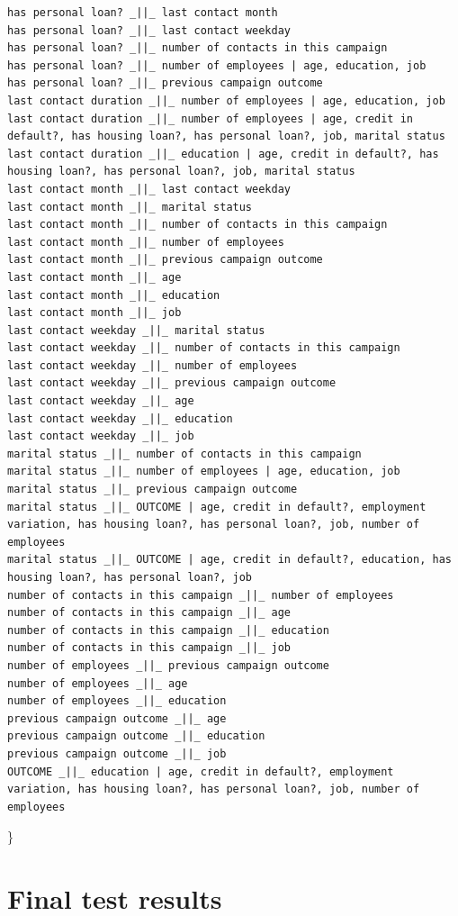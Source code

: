 \documentclass[11pt,]{article}
\begin{document}
\begin{verbatim}
has personal loan? _||_ last contact month
has personal loan? _||_ last contact weekday
has personal loan? _||_ number of contacts in this campaign
has personal loan? _||_ number of employees | age, education, job
has personal loan? _||_ previous campaign outcome
last contact duration _||_ number of employees | age, education, job
last contact duration _||_ number of employees | age, credit in default?, has housing loan?, has personal loan?, job, marital status
last contact duration _||_ education | age, credit in default?, has housing loan?, has personal loan?, job, marital status
last contact month _||_ last contact weekday
last contact month _||_ marital status
last contact month _||_ number of contacts in this campaign
last contact month _||_ number of employees
last contact month _||_ previous campaign outcome
last contact month _||_ age
last contact month _||_ education
last contact month _||_ job
last contact weekday _||_ marital status
last contact weekday _||_ number of contacts in this campaign
last contact weekday _||_ number of employees
last contact weekday _||_ previous campaign outcome
last contact weekday _||_ age
last contact weekday _||_ education
last contact weekday _||_ job
marital status _||_ number of contacts in this campaign
marital status _||_ number of employees | age, education, job
marital status _||_ previous campaign outcome
marital status _||_ OUTCOME | age, credit in default?, employment variation, has housing loan?, has personal loan?, job, number of employees
marital status _||_ OUTCOME | age, credit in default?, education, has housing loan?, has personal loan?, job
number of contacts in this campaign _||_ number of employees
number of contacts in this campaign _||_ age
number of contacts in this campaign _||_ education
number of contacts in this campaign _||_ job
number of employees _||_ previous campaign outcome
number of employees _||_ age
number of employees _||_ education
previous campaign outcome _||_ age
previous campaign outcome _||_ education
previous campaign outcome _||_ job
OUTCOME _||_ education | age, credit in default?, employment variation, has housing loan?, has personal loan?, job, number of employees
\end{verbatim}

\}

\hypertarget{final-test-results}{%
\section{Final test results}\label{final-test-results}}
\end{document}
